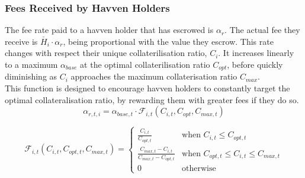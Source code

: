 \newpage
\subsubsection{Fees Received by Havven Holders}

\noindent The fee rate paid to a havven holder that has escrowed is $\alpha_r$.
The actual fee they receive is $\check{H_i} \cdot \alpha_r$, being proportional with the value they escrow.
This rate changes with respect their unique collaterilisation ratio, $C_i$. It increases linearly to a maximum $\alpha_{base}$ at the optimal collaterilisation ratio $C_{opt}$, before quickly
diminishing as $C_i$ approaches the maximum collaterisation ratio $C_{max}$.  \\

\noindent This function is designed to encourage havven holders to constantly
target the optimal collateralisation ratio, by rewarding them with greater
fees if they do so.\\



\begin{equation}
\alpha_{r,t,i} = \alpha_{base,t} \cdot \mathcal{F}_{i,t}(C_{i,t}, C_{opt}, C_{max,t})  \label{eq:feesreceived}
\end{equation}

\begin{equation}
\mathcal{F}_{i,t}(C_{i,t}, C_{opt,t}, C_{max,t}) = 
\begin{cases}
 \frac{C_{i,t}}{C_{opt,t}} &\mbox{when } C_{i,t} \leq C_{opt,t} \\[1em]
 \frac{C_{max,t} - C_{i,t}}{C_{max,t} - C_{opt,t}} &\mbox{when } C_{opt,t} \leq C_{i,t} \leq C_{max,t} \\[1em]
 0 &\mbox{otherwise}
 \end{cases}
 \label{eq:7}
\end{equation}

\begin{center}
\end{center}

